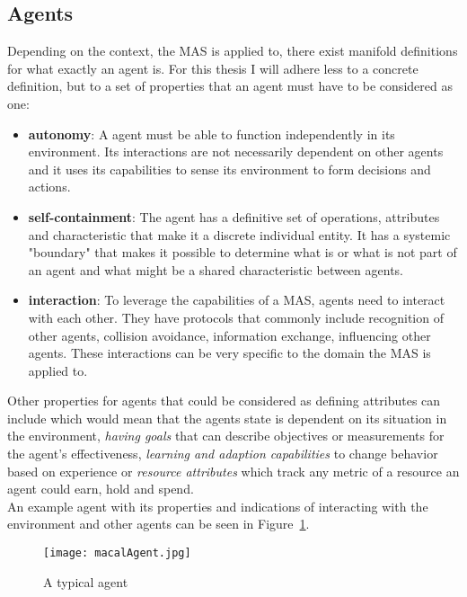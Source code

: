 \subsection{Agents}
Depending on the context, the MAS is applied to, there exist manifold definitions for what exactly an agent is. For this thesis I will adhere less to a concrete definition, but to a set of properties that an agent must have to be considered as one:
\begin{itemize}
	\item \textbf{autonomy}: A agent must be able to function independently in its environment. Its interactions are not necessarily dependent on other agents and it uses its capabilities to sense its environment to form decisions and actions.
	\item \textbf{self-containment}: The agent has a definitive set of operations, attributes and characteristic that make it a discrete individual entity. It has a systemic "boundary" that makes it possible to determine what is or what is not part of an agent and what might be a shared characteristic between agents.
	\item \textbf{interaction}: To leverage the capabilities of a MAS, agents need to interact with each other. They have protocols that commonly include recognition of other agents, collision avoidance, information exchange, influencing other agents. These interactions can be very specific to the domain the MAS is applied to.
\end{itemize}
Other properties for agents that could be considered as defining attributes can include  which would mean that the agents state is dependent on its situation in the environment, \textit{having goals} that can describe objectives or measurements for the agent's effectiveness, \textit{learning and adaption capabilities} to change behavior based on experience or \textit{resource attributes} which track any metric of a resource an agent could earn, hold and spend.~\cite{Macal2009}\\
An example agent with its properties and indications of interacting with the environment and other agents can be seen in Figure~\ref{fig:macalAgent}.
\begin{figure}
	\centering
	\texttt{[image: macalAgent.jpg]}
	\caption{A typical agent~\cite{Macal2009}}
	\label{fig:macalAgent}
\end{figure}
